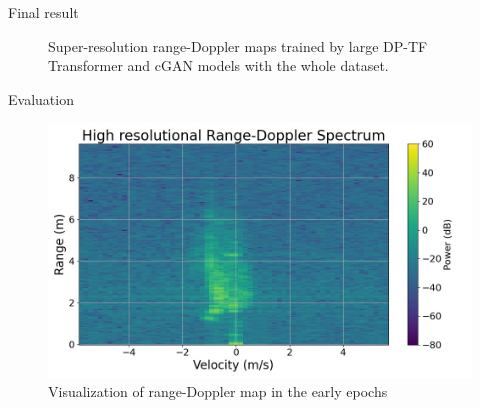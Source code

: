 \documentclass{beamer}
\begin{document}
\begin{frame}{Final result}
\begin{figure}
        \vspace{-0.2cm}
        \caption{Super-resolution range-Doppler maps trained by large DP-TF Transformer and cGAN models with the whole dataset.}
        \label{Super-resolution images trained by large models and whole dataset}
    \end{figure}
\end{frame}



\begin{frame}[t]{Evaluation}
    \vspace{1.5\baselineskip}
	\begin{figure}
        \centering
        \hspace*{-1cm}
        \begin{minipage}{0.49\textwidth}
            \centering
            \includegraphics[height=0.73\textwidth]{MA_presentation/gif_figures_testset/epoch_501.jpg}
        \end{minipage}
        \begin{minipage}{0.49\textwidth}
            \centering
        \end{minipage}
        \caption{Visualization of range-Doppler map in the early epochs}
    \end{figure}
    
\end{frame}
\end{document}
